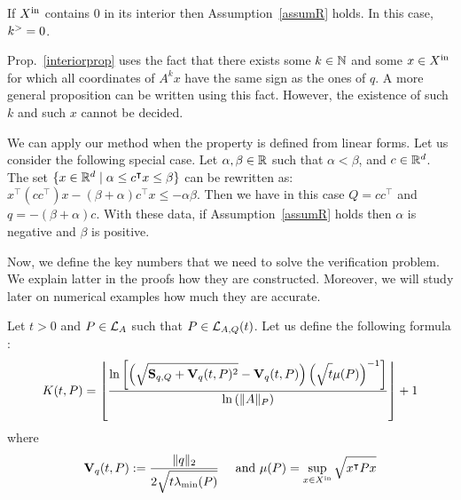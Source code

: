 \documentclass[10pt]{llncs}
\begin{document}
\begin{prop}
\label{interiorprop}
If $X^\mathrm{in}$ contains $0$ in its interior then Assumption~\ref{assumR} holds. In this case, $k^{>}=0$.
\end{prop}

%
%

Prop.~\ref{interiorprop} uses the fact that there exists some $k\in\mathbb{N}$ and some $x\in X^\mathrm{in}$ for which all coordinates of $A^k x$ have the same sign as the ones of $q$. A more general proposition can be written using this fact. However, the existence of such $k$ and such $x$ cannot be decided.     
 
\begin{remark}
\label{remarklinear}
We can apply our method when the property is defined from linear forms. 
Let us consider the following special case. Let $\alpha,\beta\in\mathbb R$ such that $\alpha<\beta$, and $c\in\mathbb R^d$. The set $\{x\in\mathbb R^d \mid \alpha \leq c^\intercal x\leq \beta\}$ can be rewritten as:
$x^\intercal (c c^\intercal) x-(\beta+\alpha) c^\intercal x \leq -\alpha \beta$. Then we have in this case $Q=c c^\intercal$ and $q= -(\beta+\alpha) c$. With these data, if Assumption~\ref{assumR} holds then $\alpha$ is negative and $\beta$ is positive. 
\end{remark}

Now, we define the key numbers that we need to solve the verification problem. We explain latter in the proofs how they are constructed. Moreover, we will study later on numerical examples how much they are accurate.  

Let $t>0$ and $P\in\mathcal{L}_{A}$ such that $P\in \mathcal{L}_{A,Q}(t)$. Let us define the following formula :
\begin{equation}
\label{intgfond}
K(t,P)=\left\lfloor \dfrac{\ln\left[\left(\sqrt{\strut \mathbf{S}_{q,Q}+\mathbf{V}_{q}(t,P)^2}-\mathbf{V}_{q}(t,P)\right)\left(\sqrt{\strut t}\mu(P)\right)^{-1}\right]}{\ln\left(\| A\|_P\right)}\right\rfloor+1
\end{equation}
where 
\[
\mathbf{V}_{q}(t,P):=\dfrac{\| q\|_2 }{2\sqrt{\strut t\lambda_{\operatorname{min}}(P)}}\quad \text{ and } \mu(P)=\sup_{x\in X^\mathrm{in}} \sqrt{\strut x^\intercal P x}
\]
\end{document}
